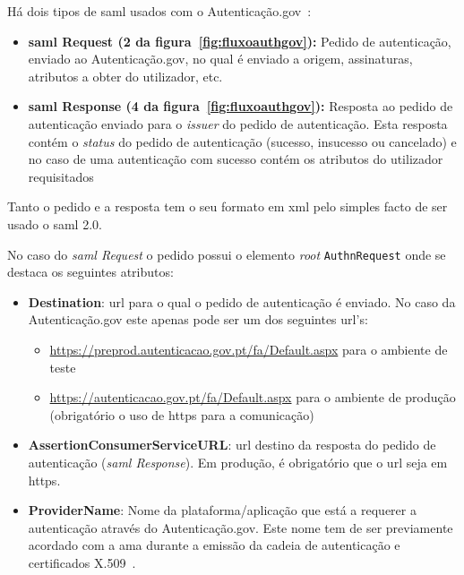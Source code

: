 Há dois tipos de \acrshort{saml} usados com o Autenticação.gov~\cite{otavioTese}:
\begin{itemize}
    \item \textbf{\acrshort{saml} Request (2 da figura~\ref{fig:fluxoauthgov}):} Pedido de autenticação, enviado ao Autenticação.gov, no qual é enviado a origem, assinaturas, atributos a obter do utilizador, etc.
    \item \textbf{\acrshort{saml} Response (4 da figura~\ref{fig:fluxoauthgov}):} Resposta ao pedido de autenticação enviado para o \textit{issuer} do pedido de autenticação. Esta resposta contém o \textit{status} do pedido de autenticação (sucesso, insucesso ou cancelado) e no caso de uma autenticação com sucesso contém os atributos do utilizador requisitados
\end{itemize}

Tanto o pedido e a resposta tem o seu formato em \acrshort{xml} pelo simples facto de ser usado o \acrshort{saml} 2.0.

No caso do \textit{\acrshort{saml} Request} o pedido possui o elemento \textit{root} \texttt{AuthnRequest} onde se destaca os seguintes atributos:
\begin{itemize}
    \item \textbf{Destination}: \acrshort{url} para o qual o pedido de autenticação é enviado. No caso da Autenticação.gov este apenas pode ser um dos seguintes \acrshort{url}'s:
    \begin{itemize}
        \item \url{https://preprod.autenticacao.gov.pt/fa/Default.aspx} para o ambiente de teste
        \item \url{https://autenticacao.gov.pt/fa/Default.aspx} para o ambiente de produção (obrigatório o uso de \acrshort{https} para a comunicação)
    \end{itemize}
    \item \textbf{AssertionConsumerServiceURL}: \acrshort{url} destino da resposta do pedido de autenticação (\textit{\acrshort{saml} Response}). Em produção, é obrigatório que o \acrshort{url} seja em \acrshort{https}.
    \item \textbf{ProviderName}: Nome da plataforma/aplicação que está a requerer a autenticação através do Autenticação.gov. Este nome tem de ser previamente acordado com a \acrshort{ama} durante a emissão da cadeia de autenticação e certificados X.509~\cite{otavioTese}.
\end{itemize}

